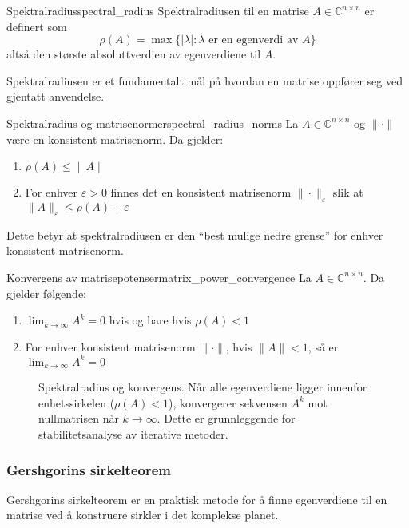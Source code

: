 \begin{definition}{Spektralradius}{spectral_radius}
	Spektralradiusen til en matrise $A \in \mathbb{C}^{n \times n}$ er definert som
	\[
		\rho(A) = \max\{|\lambda| : \lambda \text{ er en egenverdi av } A\}
	\]
	altså den største absoluttverdien av egenverdiene til $A$.
\end{definition}

Spektralradiusen er et fundamentalt mål på hvordan en matrise oppfører seg ved gjentatt anvendelse.

\begin{theorem}{Spektralradius og matrisenormer}{spectral_radius_norms}
	La $A \in \mathbb{C}^{n \times n}$ og $\|\cdot\|$ være en konsistent matrisenorm. Da gjelder:
	\begin{enumerate}
		\item $\rho(A) \leq \|A\|$
		\item For enhver $\varepsilon > 0$ finnes det en konsistent matrisenorm $\|\cdot\|_\varepsilon$ slik at $\|A\|_\varepsilon \leq \rho(A) + \varepsilon$
	\end{enumerate}
\end{theorem}

Dette betyr at spektralradiusen er den \enquote{best mulige nedre grense} for enhver konsistent matrisenorm.

\begin{remark}{Konvergens av matrisepotenser}{matrix_power_convergence}
	La $A \in \mathbb{C}^{n \times n}$. Da gjelder følgende:
	\begin{enumerate}
		\item $\lim_{k \to \infty} A^k = 0$ hvis og bare hvis $\rho(A) < 1$
		\item For enhver konsistent matrisenorm $\|\cdot\|$, hvis $\|A\| < 1$, så er $\lim_{k \to \infty} A^k = 0$
	\end{enumerate}
\end{remark}

\begin{figure}
	\centering
	
	\caption{Spektralradius og konvergens. Når alle egenverdiene ligger innenfor enhetssirkelen ($\rho(A) < 1$), konvergerer sekvensen $A^k$ mot nullmatrisen når $k \to \infty$. Dette er grunnleggende for stabilitetsanalyse av iterative metoder.}
	\label{fig:spectral_radius}
\end{figure}

\subsubsection{Gershgorins sirkelteorem}
Gershgorins sirkelteorem er en praktisk metode for å finne egenverdiene til en matrise ved å konstruere sirkler i det komplekse planet.

